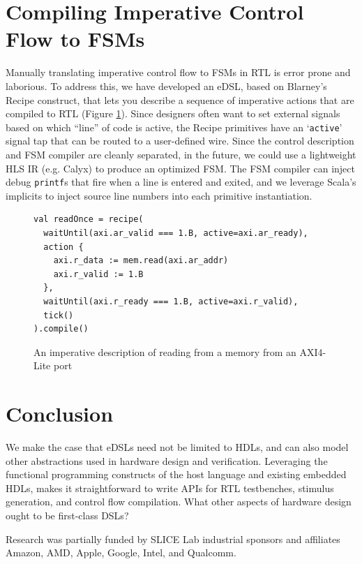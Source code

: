 \documentclass[sigplan,review,nonacm,9pt]{acmart}
\begin{document}
\section{Compiling Imperative Control Flow to FSMs}

Manually translating imperative control flow to FSMs in RTL is error prone and laborious.
To address this, we have developed an eDSL\cite{chisel_recipes}, based on Blarney's Recipe construct\cite{blarney}, that lets you describe a sequence of imperative actions that are compiled to RTL (Figure \ref{fig:recipes}).
Since designers often want to set external signals based on which ``line'' of code is active, the Recipe primitives have an `\texttt{active}' signal tap that can be routed to a user-defined wire.
Since the control description and FSM compiler are cleanly separated, in the future, we could use a lightweight HLS IR (e.g. Calyx\cite{calyx}) to produce an optimized FSM.
The FSM compiler can inject debug \texttt{printf}s that fire when a line is entered and exited, and we leverage Scala's implicits\cite{sourcecode} to inject source line numbers into each primitive instantiation.

\begin{figure}
\begin{verbatim}
val readOnce = recipe(
  waitUntil(axi.ar_valid === 1.B, active=axi.ar_ready),
  action {
    axi.r_data := mem.read(axi.ar_addr)
    axi.r_valid := 1.B
  },
  waitUntil(axi.r_ready === 1.B, active=axi.r_valid),
  tick()
).compile()
\end{verbatim}
\caption{An imperative description of reading from a memory from an AXI4-Lite port}
\label{fig:recipes}
\end{figure}

\section{Conclusion}


We make the case that eDSLs need not be limited to HDLs, and can also model other abstractions used in hardware design and verification.
Leveraging the functional programming constructs of the host language and existing embedded HDLs, makes it straightforward to write APIs for RTL testbenches, stimulus generation, and control flow compilation.
What other aspects of hardware design ought to be first-class DSLs?

\begin{acks}
Research was partially funded by SLICE Lab industrial sponsors and affiliates Amazon, AMD, Apple, Google, Intel, and Qualcomm.
\end{acks}




\end{document}
